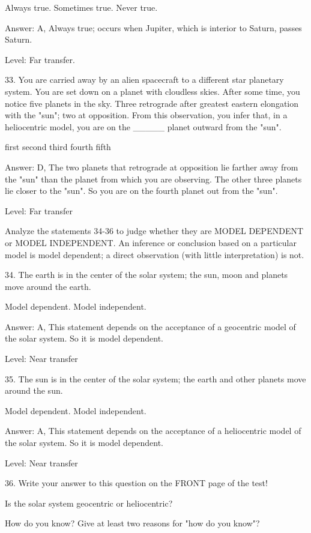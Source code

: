     Always true.
    Sometimes true.
    Never true. 

Answer: A, Always true; occurs when Jupiter, which is interior to Saturn, passes Saturn.

Level: Far transfer.

33. You are carried away by an alien spacecraft to a different star planetary system. You are set down on a planet with cloudless skies. After some time, you notice five planets in the sky. Three retrograde after greatest eastern elongation with the "sun"; two at opposition. From this observation, you infer that, in a heliocentric model, you are on the _____ planet outward from the "sun".

    first
    second
    third
    fourth
    fifth 

Answer: D, The two planets that retrograde at opposition lie farther away from the "sun" than the planet from which you are observing. The other three planets lie closer to the "sun". So you are on the fourth planet out from the "sun".

Level: Far transfer

Analyze the statements 34-36 to judge whether they are MODEL DEPENDENT or MODEL INDEPENDENT. An inference or conclusion based on a particular model is model dependent; a direct observation (with little interpretation) is not.

34. The earth is in the center of the solar system; the sun, moon and planets move around the earth.

    Model dependent.
    Model independent. 

Answer: A, This statement depends on the acceptance of a geocentric model of the solar system. So it is model dependent.

Level: Near transfer

35. The sun is in the center of the solar system; the earth and other planets move around the sun.

    Model dependent.
    Model independent. 

Answer: A, This statement depends on the acceptance of a heliocentric model of the solar system. So it is model dependent.

Level: Near transfer

36. Write your answer to this question on the FRONT page of the test!

Is the solar system geocentric or heliocentric?

    How do you know?
    Give at least two reasons for "how do you know"? 

